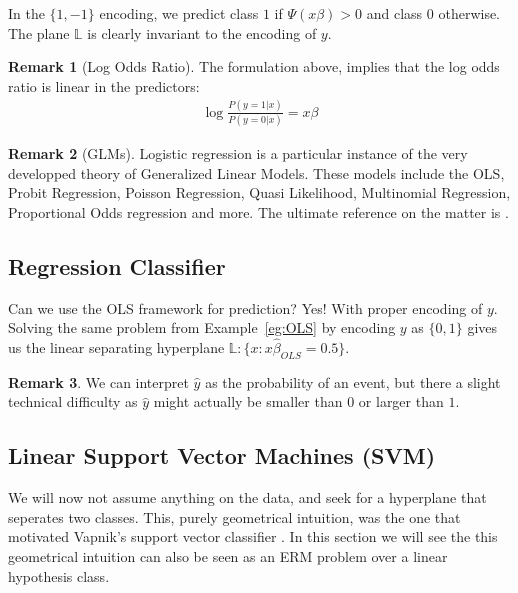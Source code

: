\documentclass[12pt,a4paper]{article}
\theoremstyle{plain}
\theoremstyle{definition}
\newtheorem{remark}{Remark}
\newcommand{\plane}{\mathbb{L}}
\begin{document}
In the $\{1,-1\}$ encoding, we predict class $1$ if $\Psi(x\beta)>0$ and class $0$ otherwise.
The plane $\plane$ is clearly invariant to the encoding of $y$.


\begin{remark}[Log Odds Ratio]
The formulation above, implies that the log odds ratio is linear in the predictors:
\begin{align*}
	\log \frac{P(y=1|x)}{P(y=0|x)} = x\beta
\end{align*}
\end{remark}



\begin{remark}[GLMs]
Logistic regression is a particular instance of the very developped theory of Generalized Linear Models.
These models include the OLS, Probit Regression, Poisson Regression, Quasi Likelihood, Multinomial Regression, Proportional Odds regression and more.
The ultimate reference on the matter is \cite{mccullagh_generalized_1989}.
\end{remark}




\subsection{Regression Classifier}
\label{sec:regression_classifier}
Can we use the OLS framework for prediction? Yes! With proper encoding of $y$.
Solving the same problem from Example~\ref{eg:OLS} by encoding $y$ as $\{0,1\}$ gives us the linear separating hyperplane $\plane: \{x:x\hat{\beta}_{OLS}=0.5\}$.

\begin{remark}
We can interpret $\hat{y}$ as the probability of an event, but there a slight technical difficulty as $\hat{y}$ might actually be smaller than $0$ or larger than $1$.
\end{remark}


\subsection{Linear Support Vector Machines (SVM)}
We will now not assume anything on the data, and seek for a hyperplane that seperates two classes.
This, purely geometrical intuition, was the one that motivated Vapnik's support vector classifier \citep{vapnik_statistical_1998}.
In this section we will see the this geometrical intuition can also be seen as an ERM problem over a linear hypothesis class.
\end{document}
